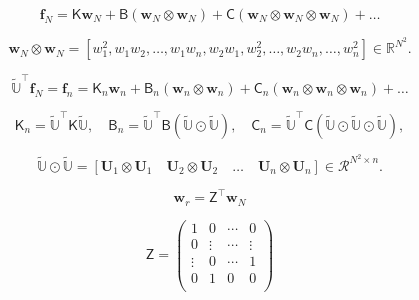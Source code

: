 \documentclass[11pt]{article}
\renewcommand{\vec}[1]{\mathbf{#1}}
\newcommand{\mat}[1]{\mathsf{#1}}
\begin{document}
\begin{equation}
\mathbf{f}_N = \mat{K} \mathbf{w}_N + \mat{B} (\mathbf{w}_N \otimes \mathbf{w}_N) + \mat{C} (\mathbf{w}_N \otimes \mathbf{w}_N \otimes \mathbf{w}_N) + \dots
\label{eq:poly_non}
\end{equation}

\begin{equation}
\mathbf{w}_N \otimes \mathbf{w}_N = [w_1^2, w_1w_2, \dots, w_1w_n, w_2w_1, w_2^2, \dots, w_2w_n, \dots, w_n^2] \in \mathbb{R}^{N^2}.
\label{eq:op}
\end{equation}

\begin{equation}
\widetilde{\mathbb{U}}^\top\vec{f}_N = \mathbf{f}_n =  \mat{K}_n \mathbf{w}_n + \mat{B}_n (\mathbf{w}_n \otimes \mathbf{w}_n) + \mat{C}_n (\mathbf{w}_n \otimes \mathbf{w}_n \otimes \mathbf{w}_n) + \dots
\label{eq:red_poly_non}
\end{equation}

\begin{equation}
\mat{K}_n = \widetilde{\mathbb{U}}^\top \mat{K} \widetilde{\mathbb{U}}, \quad \mat{B}_n = \widetilde{\mathbb{U}}^\top \mat{B} (\widetilde{\mathbb{U}} \odot \widetilde{\mathbb{U}}), \quad \mat{C}_n = \widetilde{\mathbb{U}}^\top \mat{C} (\widetilde{\mathbb{U}} \odot \widetilde{\mathbb{U}} \odot \widetilde{\mathbb{U}}),
\label{eq:red_matrices}
\end{equation}

\begin{equation}
\widetilde{\mathbb{U}} \odot \widetilde{\mathbb{U}} = [\mathbf{U}_1 \otimes \mathbf{U}_1 \quad \mathbf{U}_2 \otimes \mathbf{U}_2 \quad \ldots \quad \mathbf{U}_n \otimes \mathbf{U}_n] \in \mathcal{R}^{N^2 \times n}.
\end{equation}

\begin{equation}
{\vec{w}}_r = \mat{Z}^{\top} \vec{w}_N
\end{equation}

\begin{equation}
\mat{Z} =  
\begin{pmatrix}
1 & 0 & \cdots & 0\\
0 &  \vdots & \cdots &  \vdots \\
\vdots &  0 & \cdots &  1 \\
0 &  1 & 0 &  0 \\
\end{pmatrix}
\end{equation}
\end{document}
